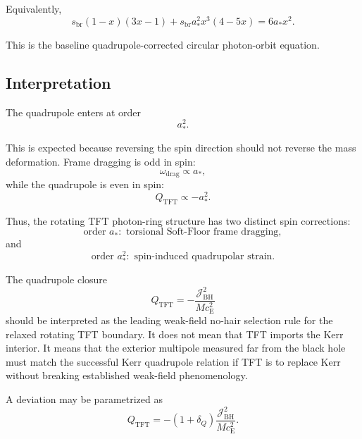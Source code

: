 Equivalently,
\begin{equation}
    \boxed{ s_{\mathrm{br}}(1-x)(3x-1) + s_{\mathrm{br}} a_\ast^2x^3(4-5x) = 6a_\ast x^2. }
\end{equation}

This is the baseline quadrupole-corrected circular photon-orbit equation.

\subsection{Interpretation}

The quadrupole enters at order
\begin{equation}
    a_\ast^2.
\end{equation}

This is expected because reversing the spin direction should not reverse the mass deformation. Frame dragging is odd in spin:
\begin{equation}
    \omega_{\mathrm{drag}} \propto a_\ast,
\end{equation}
while the quadrupole is even in spin:
\begin{equation}
    Q_{\mathrm{TFT}} \propto -a_\ast^2.
\end{equation}

Thus, the rotating TFT photon-ring structure has two distinct spin corrections:
\begin{equation}
    \boxed{ \text{order } a_\ast: \text{ torsional Soft-Floor frame dragging}, }
\end{equation}
and
\begin{equation}
    \boxed{ \text{order } a_\ast^2: \text{ spin-induced quadrupolar strain}. }
\end{equation}

The quadrupole closure
\begin{equation}
    Q_{\mathrm{TFT}} = -\frac{\mathcal{J}_{\mathrm{BH}}^2}{M c_{\mathrm{E}}^2}
\end{equation}
should be interpreted as the leading weak-field no-hair selection rule for the relaxed rotating TFT boundary. It does not mean that TFT imports the Kerr interior. It means that the exterior multipole measured far from the black hole must match the successful Kerr quadrupole relation if TFT is to replace Kerr without breaking established weak-field phenomenology.

A deviation may be parametrized as
\begin{equation}
    Q_{\mathrm{TFT}} = -(1+\delta_Q) \frac{\mathcal{J}_{\mathrm{BH}}^2}{M c_{\mathrm{E}}^2}.
\end{equation}

